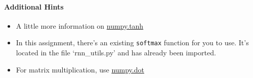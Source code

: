 \documentclass[11pt]{article}
\providecommand{\tightlist}{%
      \setlength{\itemsep}{0pt}\setlength{\parskip}{0pt}}
\begin{document}
\hypertarget{additional-hints}{%
\paragraph{Additional Hints}\label{additional-hints}}

\begin{itemize}
\tightlist
\item
  A little more information on
  \href{https://numpy.org/devdocs/reference/generated/numpy.tanh.html}{numpy.tanh}
\item
  In this assignment, there's an existing \texttt{softmax} function for
  you to use. It's located in the file `rnn\_utils.py' and has already
  been imported.
\item
  For matrix multiplication, use
  \href{https://docs.scipy.org/doc/numpy/reference/generated/numpy.dot.html}{numpy.dot}
\end{itemize}
\end{document}
